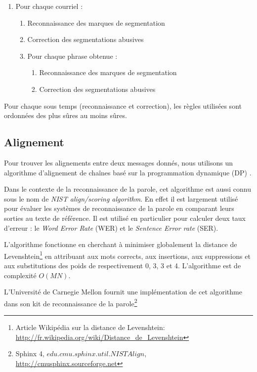 \begin{enumerate}
    \item[] Pour chaque courriel :
    \begin{enumerate}
        \item Reconnaissance des marques de segmentation
        \item Correction des segmentations abusives
        \item Pour chaque phrase obtenue :
        \begin{enumerate}
            \item Reconnaissance des marques de segmentation
            \item Correction des segmentations abusives
        \end{enumerate}
    \end{enumerate}
\end{enumerate}

Pour chaque sous temps (reconnaissance et correction), les règles utilisées sont ordonnées des plus sûres au moins sûres.

\subsection{Alignement}

\label{subsec:alignment}

Pour trouver les alignements entre deux messages donnés, nous utilisons un algorithme d'alignement de chaînes basé sur la programmation dynamique (DP) \cite{sankoff:1983}. 

Dans le contexte de la reconnaissance de la parole, cet algorithme est aussi connu sous le nom de \textit{NIST align/scoring algorithm}. En effet il est largement utilisé pour évaluer les systèmes de reconnaissance de la parole en comparant leurs sorties au texte de référence. Il est utilisé en particulier pour calculer deux taux d'erreur : le \textit{Word Error Rate} (WER) et le \textit{Sentence Error rate} (SER).

L'algorithme fonctionne en cherchant à minimiser globalement la distance de Levenshtein\footnote{Article Wikipédia sur la distance de Levenshtein: \url{http://fr.wikipedia.org/wiki/Distance_de_Levenshtein}} \cite{levenshtein1966binary} en attribuant aux mots corrects, aux insertions, aux suppressions et aux substitutions des poids de respectivement 0, 3, 3 et 4. L'algorithme est de complexité $O(MN)$.

L'Université de Carnegie Mellon fournit une implémentation de cet algorithme dans son kit de reconnaissance de la parole\footnote{Sphinx 4, $edu.cmu.sphinx.util.NISTAlign$, \url{http://cmusphinx.sourceforge.net}}

